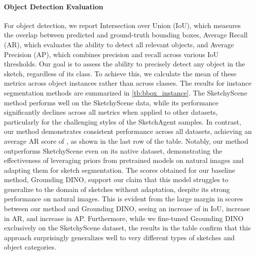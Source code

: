 \paragraph{Object Detection Evaluation}
For object detection, we report Intersection over Union (IoU), which measures the overlap between predicted and ground-truth bounding boxes, Average Recall (AR), which evaluates the ability to detect all relevant objects, and Average Precision (AP), which combines precision and recall across various IoU thresholds. Our goal is to assess the ability to precisely detect any object in the sketch, regardless of its class. To achieve this, we calculate the mean of these metrics across object instances rather than across classes. 
The results for instance segmentation methods are summarized in \cref{tb:bbox_instance}. 
The SketchyScene method performs well on the SketchyScene data, while its performance significantly declines across all metrics when applied to other datasets, particularly for the challenging styles of the SketchAgent samples. 
In contrast, our method demonstrates consistent performance across all datasets, achieving an average AR score of , as shown in the last row of the table. Notably, our method outperforms SketchyScene even on its native dataset, demonstrating the effectiveness of leveraging priors from pretrained models on natural images and adapting them for sketch segmentation.
The scores obtained for our baseline method, Grounding DINO, support our claim that this model struggles to generalize to the domain of sketches without adaptation, despite its strong performance on natural images. This is evident from the large margin in scores between our method and Grounding DINO, seeing an increase of  in IoU,  increase in AR, and  increase in AP.  Furthermore, while we fine-tuned Grounding DINO exclusively on the SketchyScene dataset, the results in the table confirm that this approach surprisingly generalizes well to very different types of sketches and object categories.

